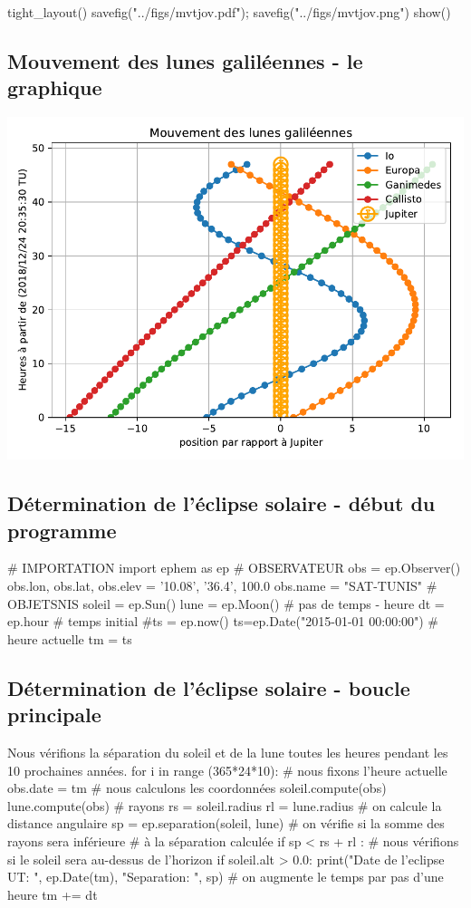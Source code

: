 \documentclass[%
oneside,                 %
final,                   %
10pt]{article}
\begin{document}
tight_layout()
savefig("../figs/mvtjov.pdf"); savefig("../figs/mvtjov.png")
show()
\epycod
\subsection{Mouvement des lunes galiléennes - le graphique}


\vspace{6mm}

\centerline{\includegraphics[width=0.9\linewidth]{figs/mvtjov.pdf}}

\vspace{6mm}



\subsection{Détermination de l'éclipse solaire - début du programme}
\bpycod
# IMPORTATION
import ephem as ep
# OBSERVATEUR
obs = ep.Observer()
obs.lon, obs.lat, obs.elev = '10.08', '36.4', 100.0
obs.name = "SAT-TUNIS"
# OBJETSNIS
soleil = ep.Sun()
lune = ep.Moon()
# pas de temps - heure
dt = ep.hour
# temps initial
#ts = ep.now()
ts=ep.Date("2015-01-01 00:00:00")
# heure actuelle
tm = ts
\epycod

\subsection{Détermination de l'éclipse solaire - boucle principale}
Nous vérifions la séparation du soleil et de la lune toutes les heures pendant les 10 prochaines années.
\bpycod
for i in range (365*24*10):
    # nous fixons l'heure actuelle
    obs.date = tm
    # nous calculons les coordonnées
    soleil.compute(obs)
    lune.compute(obs)
    # rayons
    rs = soleil.radius
    rl = lune.radius
    # on calcule la distance angulaire
    sp = ep.separation(soleil, lune)
    # on vérifie si la somme des rayons sera inférieure
    # à la séparation calculée
    if sp < rs + rl :
    # nous vérifions si le soleil sera au-dessus de l'horizon
        if soleil.alt > 0.0:
            print("Date de l'eclipse UT: ", ep.Date(tm), "Separation: ", sp)
    # on augmente le temps par pas d'une heure
    tm += dt
\epycod
\end{document}

